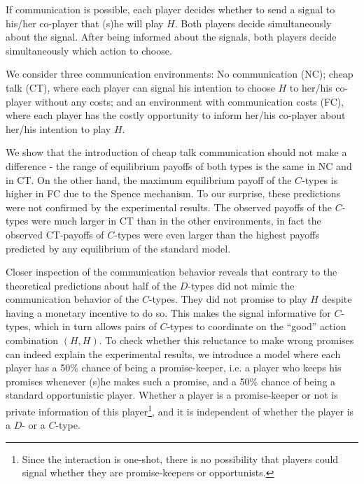\documentclass[12pt]{article}
\theoremstyle{break}
\begin{document}
If communication is possible, each player decides whether to send a signal to his/her co-player that (s)he will play $H$. Both players decide simultaneously about the signal. After being informed about the signals, both players decide simultaneously which action to choose.

We consider three communication environments: No communication (NC); cheap talk (CT), where each player can signal his intention to choose $H$ to her/his co-player without any costs; and an environment with communication costs (FC), where each player has the costly opportunity to inform her/his co-player about her/his intention to play $H$.

We show that the introduction of cheap talk communication should not make a difference - the range of equilibrium payoffs of both types is the same in NC and in CT. On the other hand, the maximum equilibrium payoff of the $C$-types is higher in FC due to the Spence mechanism. To our surprise, these predictions were not confirmed by the experimental results. The observed payoffs of the $C$-types were much larger in CT than in the other environments, in fact the observed CT-payoffs of $C$-types were even larger than the highest payoffs predicted by any equilibrium of the standard model.

Closer inspection of the communication behavior reveals that contrary to the theoretical predictions about half of the $D$-types did not mimic the communication behavior of the $C$-types. They did not promise to play $H$ despite having a monetary incentive to do so. This makes the signal informative for $C$-types, which in turn allows pairs of $C$-types to coordinate on the ``good'' action combination $(H,H)$. To check whether this reluctance to make wrong promises can indeed explain the experimental results, we introduce a model where each player has a 50\% chance of being a promise-keeper, i.e. a player who keeps his promises whenever (s)he makes such a promise, and a 50\% chance of being a standard opportunistic player. Whether a player is a promise-keeper or not is private information of this player\footnote{%
Since the interaction is one-shot, there is no possibility that players could signal whether they are promise-keepers or opportunists.}, and it is independent of whether the player is a $D$- or a $C$-type.
\end{document}
